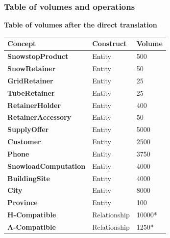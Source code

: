 \documentclass{article}[h]
\begin{document}
{\vspace{12px}

\subsubsection{Table of volumes and operations}

{\centering \textbf{Table of volumes after the direct translation}\\}

\begin{table}[H]
  \def\arraystretch{1.25}%
  \centering
  \begin{tabular}{ | m{4.5cm} | m{4.5cm}| m{4.5cm} |}  
    \hline
    {\textbf{\large Concept}} & {\textbf{\large Construct}} & {\textbf{\large Volume}} \\ 
    \hline
    \color[HTML]{3531FF} \textbf{SnowstopProduct} & Entity & 500  \\ 
    \hline
    \color[HTML]{3531FF} \textbf{SnowRetainer} & Entity & 50 \\  
    \hline
    \color[HTML]{3531FF} \textbf{GridRetainer} & Entity & 25 \\ 
    \hline
    \color[HTML]{3531FF} \textbf{TubeRetainer} & Entity & 25 \\ 
    \hline
    \color[HTML]{3531FF} \textbf{RetainerHolder} & Entity & 400 \\ 
    \hline
    \color[HTML]{3531FF} \textbf{RetainerAccessory} & Entity & 50 \\ 
    \hline
    \color[HTML]{3531FF} \textbf{SupplyOffer} & Entity & 5000\\  
    \hline
    \color[HTML]{3531FF} \textbf{Customer} & Entity & 2500\\ 
    \hline
    \color[HTML]{3531FF} \textbf{Phone} & Entity & 3750 \\ 
    \hline
    \color[HTML]{3531FF} \textbf{SnowloadComputation} & Entity & 4000\\  
    \hline
    \color[HTML]{3531FF} \textbf{BuildingSite} & Entity & 4000\\ 
    \hline
    \color[HTML]{3531FF} \textbf{City} & Entity & 8000 \\ 
    \hline
    \color[HTML]{3531FF} \textbf{Province} & Entity & 100 \\ 
    \hline
    \color[HTML]{3531FF} \textbf{H-Compatible} & Relationship & 10000* \\ 
    \hline
    \color[HTML]{3531FF} \textbf{A-Compatible} & Relationship & 1250* \\ 

\end{tabular}
\end{table}}
\end{document}
